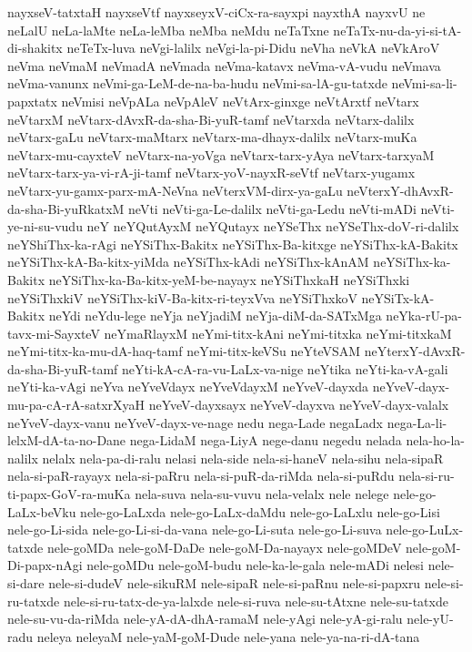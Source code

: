 {nayxseV-tatxtaH
nayxseVtf
nayxseyxV-ciCx-ra-sayxpi
nayxthA
nayxvU
ne
neLalU
neLa-laMte
neLa-leMba
neMba
neMdu
neTaTxne
neTaTx-nu-da-yi-si-tA-di-shakitx
neTeTx-luva
neVgi-lalilx
neVgi-la-pi-Didu
neVha
neVkA
neVkAroV
neVma
neVmaM
neVmadA
neVmada
neVma-katavx
neVma-vA-vudu
neVmava
neVma-vanunx
neVmi-ga-LeM-de-na-ba-hudu
neVmi-sa-lA-gu-tatxde
neVmi-sa-li-papxtatx
neVmisi
neVpALa
neVpAleV
neVtArx-ginxge
neVtArxtf
neVtarx
neVtarxM
neVtarx-dAvxR-da-sha-Bi-yuR-tamf
neVtarxda
neVtarx-dalilx
neVtarx-gaLu
neVtarx-maMtarx
neVtarx-ma-dhayx-dalilx
neVtarx-muKa
neVtarx-mu-cayxteV
neVtarx-na-yoVga
neVtarx-tarx-yAya
neVtarx-tarxyaM
neVtarx-tarx-ya-vi-rA-ji-tamf
neVtarx-yoV-nayxR-seVtf
neVtarx-yugamx
neVtarx-yu-gamx-parx-mA-NeVna
neVterxVM-dirx-ya-gaLu
neVterxY-dhAvxR-da-sha-Bi-yuRkatxM
neVti
neVti-ga-Le-dalilx
neVti-ga-Ledu
neVti-mADi
neVti-ye-ni-su-vudu
neY
neYQutAyxM
neYQutayx
neYSeThx
neYSeThx-doV-ri-dalilx
neYShiThx-ka-rAgi
neYSiThx-Bakitx
neYSiThx-Ba-kitxge
neYSiThx-kA-Bakitx
neYSiThx-kA-Ba-kitx-yiMda
neYSiThx-kAdi
neYSiThx-kAnAM
neYSiThx-ka-Bakitx
neYSiThx-ka-Ba-kitx-yeM-be-nayayx
neYSiThxkaH
neYSiThxki
neYSiThxkiV
neYSiThx-kiV-Ba-kitx-ri-teyxVva
neYSiThxkoV
neYSiTx-kA-Bakitx
neYdi
neYdu-lege
neYja
neYjadiM
neYja-diM-da-SATxMga
neYka-rU-pa-tavx-mi-SayxteV
neYmaRlayxM
neYmi-titx-kAni
neYmi-titxka
neYmi-titxkaM
neYmi-titx-ka-mu-dA-haq-tamf
neYmi-titx-keVSu
neYteVSAM
neYterxY-dAvxR-da-sha-Bi-yuR-tamf
neYti-kA-cA-ra-vu-LaLx-va-nige
neYtika
neYti-ka-vA-gali
neYti-ka-vAgi
neYva
neYveVdayx
neYveVdayxM
neYveV-dayxda
neYveV-dayx-mu-pa-cA-rA-satxrXyaH
neYveV-dayxsayx
neYveV-dayxva
neYveV-dayx-valalx
neYveV-dayx-vanu
neYveV-dayx-ve-nage
nedu
nega-Lade
negaLadx
nega-La-li-lelxM-dA-ta-no-Dane
nega-LidaM
nega-LiyA
nege-danu
negedu
nelada
nela-ho-la-nalilx
nelalx
nela-pa-di-ralu
nelasi
nela-side
nela-si-haneV
nela-sihu
nela-sipaR
nela-si-paR-rayayx
nela-si-paRru
nela-si-puR-da-riMda
nela-si-puRdu
nela-si-ru-ti-papx-GoV-ra-muKa
nela-suva
nela-su-vuvu
nela-velalx
nele
nelege
nele-go-LaLx-beVku
nele-go-LaLxda
nele-go-LaLx-daMdu
nele-go-LaLxlu
nele-go-Lisi
nele-go-Li-sida
nele-go-Li-si-da-vana
nele-go-Li-suta
nele-go-Li-suva
nele-go-LuLx-tatxde
nele-goMDa
nele-goM-DaDe
nele-goM-Da-nayayx
nele-goMDeV
nele-goM-Di-papx-nAgi
nele-goMDu
nele-goM-budu
nele-ka-le-gala
nele-mADi
nelesi
nele-si-dare
nele-si-dudeV
nele-sikuRM
nele-sipaR
nele-si-paRnu
nele-si-papxru
nele-si-ru-tatxde
nele-si-ru-tatx-de-ya-lalxde
nele-si-ruva
nele-su-tAtxne
nele-su-tatxde
nele-su-vu-da-riMda
nele-yA-dA-dhA-ramaM
nele-yAgi
nele-yA-gi-ralu
nele-yU-radu
neleya
neleyaM
nele-yaM-goM-Dude
nele-yana
nele-ya-na-ri-dA-tana
}
